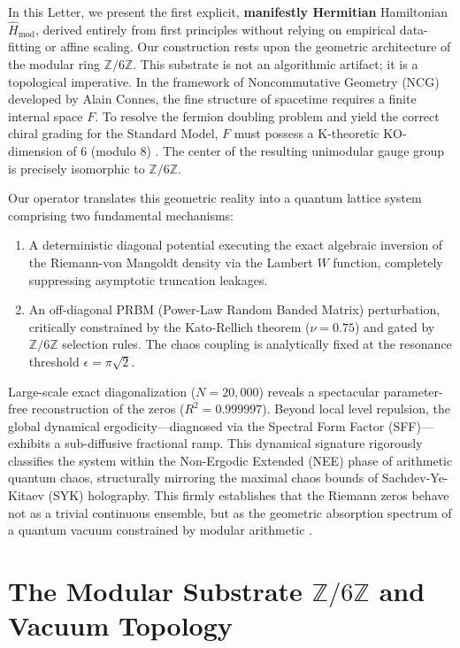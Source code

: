 \documentclass[aps,prl,preprint,superscriptaddress,floatfix]{revtex4-2}
\newcommand{\Zmod}{\mathbb{Z}/6\mathbb{Z}}
\begin{document}
In this Letter, we present the first explicit, \textbf{manifestly Hermitian} Hamiltonian $\hat{H}_{\text{mod}}$, derived entirely from first principles without relying on empirical data-fitting or affine scaling. Our construction rests upon the geometric architecture of the modular ring $\mathbb{Z}/6\mathbb{Z}$. This substrate is not an algorithmic artifact; it is a topological imperative. In the framework of Noncommutative Geometry (NCG) developed by Alain Connes, the fine structure of spacetime requires a finite internal space $F$. To resolve the fermion doubling problem and yield the correct chiral grading for the Standard Model, $F$ must possess a K-theoretic KO-dimension of 6 (modulo 8) \cite{Connes2008, Chamseddine2007, ConnesConsani2021}. The center of the resulting unimodular gauge group is precisely isomorphic to $\Zmod$.


Our operator translates this geometric reality into a quantum lattice system comprising two fundamental mechanisms:
\begin{enumerate}
    \item A deterministic diagonal potential executing the exact algebraic inversion of the Riemann-von Mangoldt density via the Lambert $W$ function, completely suppressing asymptotic truncation leakages.
    \item An off-diagonal PRBM (Power-Law Random Banded Matrix) perturbation, critically constrained by the Kato-Rellich theorem ($\nu = 0.75$) and gated by $\Zmod$ selection rules. The chaos coupling is analytically fixed at the resonance threshold $\epsilon = \pi\sqrt{2}$.
\end{enumerate}

Large-scale exact diagonalization ($N=20,000$) reveals a spectacular parameter-free reconstruction of the zeros ($R^2 = 0.999997$). Beyond local level repulsion, the global dynamical ergodicity—diagnosed via the Spectral Form Factor (SFF)—exhibits a sub-diffusive fractional ramp. This dynamical signature rigorously classifies the system within the Non-Ergodic Extended (NEE) phase of arithmetic quantum chaos, structurally mirroring the maximal chaos bounds of Sachdev-Ye-Kitaev (SYK) holography. This firmly establishes that the Riemann zeros behave not as a trivial continuous ensemble, but as the geometric absorption spectrum of a quantum vacuum constrained by modular arithmetic \cite{Connes1999}.


\section{The Modular Substrate \texorpdfstring{$\mathbb{Z}/6\mathbb{Z}$}{Z/6Z} and Vacuum Topology}
\end{document}
